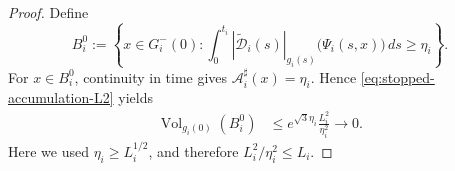 \documentclass{amsart}
\begin{document}
\begin{proof}
\noindent
Define
\[
        B_i^0
        :=
        \left\{
        x\in G_i^-(0):
        \int_0^{t_i}
        |\widetilde{\mathcal D}_i(s)|_{g_i(s)}
        \bigl(\Psi_i(s,x)\bigr)\,ds
        \geq\eta_i
        \right\}.
\]
For \(x\in B_i^0\), continuity in time gives
\(\mathcal A_i^\sharp(x)=\eta_i\). Hence
\eqref{eq:stopped-accumulation-L2} yields
\begin{equation}
\label{eq:modified-initial-bad-volume}
\begin{aligned}
        \operatorname{Vol}_{g_i(0)}(B_i^0)
        &\leq
        e^{\sqrt{3}\eta_i}
        \frac{L_i^2}{\eta_i^2}
        \longrightarrow0 .
\end{aligned}
\end{equation}
Here we used \(\eta_i\geq L_i^{1/2}\), and therefore
\(L_i^2/\eta_i^2\leq L_i\).


\end{proof}
\end{document}
